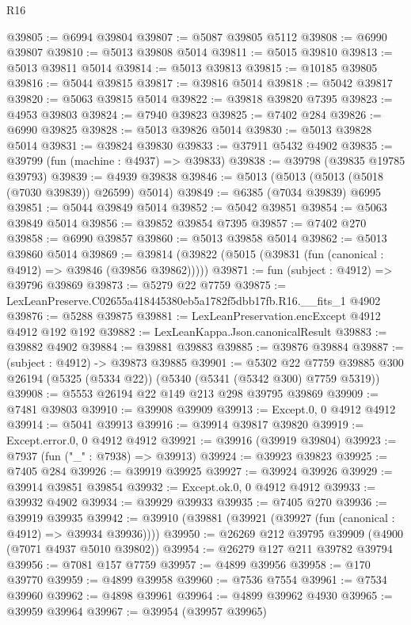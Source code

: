 \begin{lexlean}{R16}
\begin{coremodule}
@39805 := @6994 @39804
@39807 := @5087 @39805 @5112
@39808 := @6990 @39807
@39810 := @5013 @39808 @5014
@39811 := @5015 @39810
@39813 := @5013 @39811 @5014
@39814 := @5013 @39813
@39815 := @10185 @39805
@39816 := @5044 @39815
@39817 := @39816 @5014
@39818 := @5042 @39817
@39820 := @5063 @39815 @5014
@39822 := @39818 @39820 @7395
@39823 := @4953 @39803
@39824 := @7940 @39823
@39825 := @7402 @284
@39826 := @6990 @39825
@39828 := @5013 @39826 @5014
@39830 := @5013 @39828 @5014
@39831 := @39824 @39830
@39833 := @37911 @5432 @4902
@39835 := @39799 (fun (machine : @4937) => @39833)
@39838 := @39798 (@39835 @19785 @39793)
@39839 := @4939 @39838
@39846 := @5013 (@5013 (@5013 (@5018 (@7030 @39839)) @26599) @5014)
@39849 := @6385 (@7034 @39839) @6995
@39851 := @5044 @39849 @5014
@39852 := @5042 @39851
@39854 := @5063 @39849 @5014
@39856 := @39852 @39854 @7395
@39857 := @7402 @270
@39858 := @6990 @39857
@39860 := @5013 @39858 @5014
@39862 := @5013 @39860 @5014
@39869 := @39814 (@39822 (@5015 (@39831 (fun (canonical : @4912) => @39846 (@39856 @39862)))))
@39871 := fun (subject : @4912) => @39796 @39869
@39873 := @5279 @22 @7759
@39875 := LexLeanPreserve.C02655a418445380eb5a1782f5dbb17fb.R16.__fits_1 @4902
@39876 := @5288 @39875
@39881 := LexLeanPreservation.encExcept @4912 @4912 @192 @192
@39882 := LexLeanKappa.Json.canonicalResult
@39883 := @39882 @4902
@39884 := @39881 @39883
@39885 := @39876 @39884
@39887 := (subject : @4912) -> @39873 @39885
@39901 := @5302
    @22
    @7759
    @39885
    @300
    @26194
    (@5325 (@5334 @22))
    (@5340 (@5341 (@5342 @300) @7759 @5319))
@39908 := @5553 @26194 @22 @149 @213 @298 @39795 @39869
@39909 := @7481 @39803
@39910 := @39908 @39909
@39913 := Except.{0, 0} @4912 @4912
@39914 := @5041 @39913
@39916 := @39914 @39817 @39820
@39919 := Except.error.{0, 0} @4912 @4912
@39921 := @39916 (@39919 @39804)
@39923 := @7937 (fun ("_" : @7938) => @39913)
@39924 := @39923 @39823
@39925 := @7405 @284
@39926 := @39919 @39925
@39927 := @39924 @39926
@39929 := @39914 @39851 @39854
@39932 := Except.ok.{0, 0} @4912 @4912
@39933 := @39932 @4902
@39934 := @39929 @39933
@39935 := @7405 @270
@39936 := @39919 @39935
@39942 := @39910 (@39881 (@39921 (@39927 (fun (canonical : @4912) => @39934 @39936))))
@39950 := @26269 @212 @39795 @39909 (@4900 (@7071 @4937 @5010 @39802))
@39954 := @26279 @127 @211 @39782 @39794
@39956 := @7081 @157 @7759
@39957 := @4899 @39956
@39958 := @170 @39770
@39959 := @4899 @39958
@39960 := @7536 @7554
@39961 := @7534 @39960
@39962 := @4898 @39961
@39964 := @4899 @39962 @4930
@39965 := @39959 @39964
@39967 := @39954 (@39957 @39965)

\end{coremodule}
\end{lexlean}
